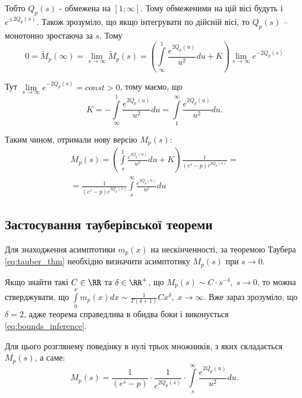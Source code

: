 Тобто $Q_p(s)$ - обмежена на $[1; \infty]$. Тому обмеженими на цій вісі будуть і $e^{\pm 2Q_p(s)}$. Також зрозуміло, що якщо інтегрувати по дійсній вісі, то $Q_p(s)$ – монотонно зростаюча за $s$. Тому
\begin{equation}
0 = \tilde M_p(\infty) = \lim_{s\rightarrow \infty} \tilde M_p(s) = \left( \int\limits_\infty^1 \frac{e^{2Q_p(u)}}{u^2} du + K \right) \lim_{s\rightarrow \infty} e^{- 2Q_p(s)}
\end{equation}

Тут $\lim\limits_{s\rightarrow \infty} e^{- 2Q_p(s)} = const > 0$, тому маємо, що
\begin{equation}
K = -  \int\limits_\infty^1 \frac{e^{2Q_p(u)}}{u^2} du =  \int\limits_1^\infty \frac{e^{2Q_p(u)}}{u^2} du.
\end{equation}

Таким чином, отримали нову версію $M_{p}(s)$:
\begin{equation}
\begin{gathered}
\label{eq:model_laplace_sol}
M_p(s)= \left( \int\limits_s^1 \frac{e^{2Q_p(u)}}{u^2} du + K \right) \frac{1}{(e^s - p)  e^{2Q_p(s)}}
= \\
=\frac{1}{(e^s - p)  e^{2Q_p(s)}} \int\limits_s^\infty \frac{e^{2Q_p(u)}}{u^2} du
\end{gathered}
\end{equation}

\subsection{Застосування тауберівської теореми}

Для знаходження асимптотики $m_p(x)$ на нескінченності, за теоремою Таубера \eqref{eq:tauber_thm} необхідно визначити асимптотику $M_p(s)$ при $s \rightarrow 0$.

Якщо знайти такі $C \in \RR$ та $\delta \in \RR^+$, що $M_p(s) \sim C \cdot s^{-\delta}, \; s \rightarrow 0$, то можна стверджувати, що $\int\limits_0^x m_p(x) dx \sim \frac{1}{\Gamma(\delta + 1)} C x^\delta, \; x \rightarrow \infty$. Вже зараз зрозуміло, що $\delta = 2$, адже теорема справедлива в обидва боки і виконується \eqref{eq:bounds_inference}.

Для цього розглянему поведінку в нулі трьох множників, з яких складається $M_p(s)$, а саме:
\begin{equation*}
M_p(s)=\frac{1}{(e^s - p)} \cdot \frac{1}{ e^{2Q_p(s)}} \cdot \int\limits_s^\infty \frac{e^{2Q_p(u)}}{u^2} du.
\end{equation*}


